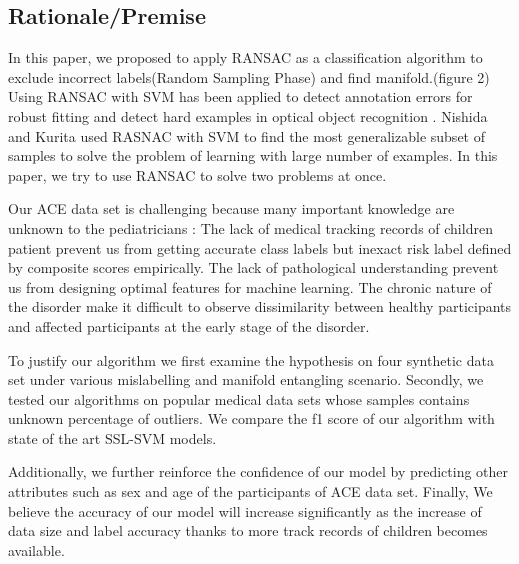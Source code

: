 \documentclass[a4paper, times, 12pt, ,onecolumn,oneside,top=1.0cm,bottom=1.0cm,left=1.0 cm,right=1cm]{article}
\begin{document}
  \subsection{Rationale/Premise}
    In this paper, we proposed to apply RANSAC as a classification algorithm to exclude incorrect labels(Random Sampling Phase) and find manifold.(figure 2) Using RANSAC with SVM has been applied to detect annotation errors for robust fitting and detect hard examples in optical object recognition \cite{BMVC2015_168}. Nishida and Kurita \cite{4761280} used RASNAC with SVM to find the most generalizable subset of samples to solve the problem of learning with large number of examples. In this paper, we try to use RANSAC to solve two problems at once. 

Our ACE data set is challenging because many important knowledge are unknown to the pediatricians : The lack of medical tracking records of children patient prevent us from getting accurate class labels but inexact risk label defined by composite scores empirically. The lack of pathological understanding prevent us from designing optimal features for machine learning. The chronic nature of the disorder make it difficult to observe dissimilarity between healthy participants and affected participants at the early stage of the disorder. 

To justify our algorithm we first examine the hypothesis on four synthetic data set under various mislabelling and manifold entangling scenario. Secondly, we tested our algorithms on popular medical data sets whose samples contains unknown percentage of outliers. We compare the f1 score of our algorithm with state of the art SSL-SVM models.

Additionally, we further reinforce the confidence of our model by predicting other attributes such as sex and age of the participants of ACE data set. Finally,  We believe the accuracy of our model will increase significantly as the increase of data size and label accuracy thanks to more track records of children becomes available. 
\end{document}

